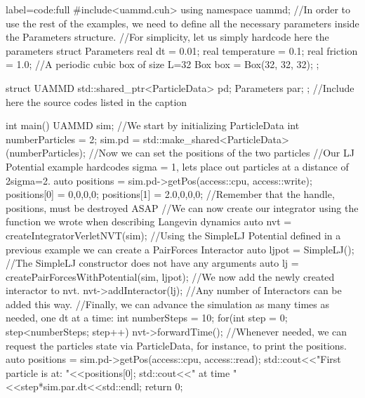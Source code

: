 \documentclass[ twoside,openright,titlepage,numbers=noenddot,%
headinclude,footinclude,cleardoublepage=empty,abstract=on,
BCOR=5mm,paper=b5,fontsize=11pt, dvipsnames
]{scrreprt}
\begin{document}
\begin{code2}{label=code:full}
  #include<uammd.cuh>
  using namespace uammd;
  //In order to use the rest of the examples, we need to define all the necessary parameters inside the Parameters structure.
  //For simplicity, let us simply hardcode here the parameters
  struct Parameters{
    real dt = 0.01;
    real temperature = 0.1;
    real friction = 1.0;
    //A periodic cubic box of size L=32
    Box box = Box({32, 32, 32});
  };
  
  struct UAMMD{
    std::shared_ptr<ParticleData> pd;
    Parameters par;
  };
  //Include here the source codes listed in the caption

  int main(){
    UAMMD sim;
    //We start by initializing ParticleData
    int numberParticles = 2;
    sim.pd = std::make_shared<ParticleData>(numberParticles);
    //Now we can set the positions of the two particles
    {//Our LJ Potential example hardcodes sigma = 1, lets place out particles at a distance of 2sigma=2.
      auto positions = sim.pd->getPos(access::cpu, access::write);
      positions[0] = {0,0,0,0};
      positions[1] = {2.0,0,0,0};
    }//Remember that the handle, positions, must be destroyed ASAP
    //We can now create our integrator using the function we wrote when describing Langevin dynamics
    auto nvt = createIntegratorVerletNVT(sim);
    //Using the SimpleLJ Potential defined in a previous example we can create a PairForces Interactor
    auto ljpot = SimpleLJ(); //The SimpleLJ constructor does not have any arguments
    auto lj = createPairForcesWithPotential(sim, ljpot);
    //We now add the newly created interactor to nvt.
    nvt->addInteractor(lj);
    //Any number of Interactors can be added this way.
    //Finally, we can advance the simulation as many times as needed, one dt at a time:
    int numberSteps = 10;
    for(int step = 0; step<numberSteps; step++){
      nvt->forwardTime();
      //Whenever needed, we can request the particles state via ParticleData, for instance, to print the positions.
      {
        auto positions = sim.pd->getPos(access::cpu, access::read);
        std::cout<<"First particle is at: "<<positions[0];
        std::cout<<" at time "<<step*sim.par.dt<<std::endl;
      }
    }
    return 0;
  }
\end{code2}
\end{document}
